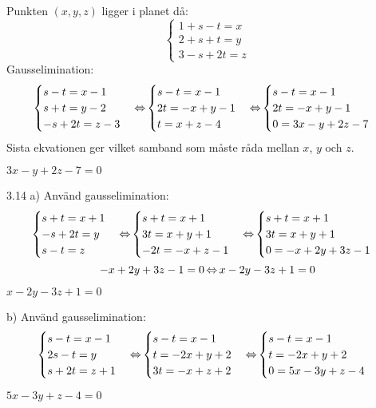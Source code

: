 \pagebreak
\begin{task}{3.13}
	Punkten $(x,y,z)$ ligger i planet då: 
	\[\begin{cases}
		1+s-t=x \\
		2+s+t=y \\
		3-s+2t=z
	\end{cases}\]
	Gausselimination:
	\begin{align*}
		\begin{cases}
			s-t=x-1 \\
			s+t=y-2 \\
			-s+2t=z-3
		\end{cases} \operatorname{\Leftrightarrow}
		\begin{cases}
			s-t=x-1 \\
			2t=-x+y-1 \\
			t=x+z-4
		\end{cases} \operatorname{\Leftrightarrow}
		\begin{cases}
			s-t=x-1 \\
			2t=-x+y-1 \\
			0=3x-y+2z-7
		\end{cases}
	\end{align*}
	Sista ekvationen ger vilket samband som måste råda mellan $x$, $y$ och $z$.

	\ans $3x-y+2z-7=0$
\end{task}

\begin{task}{3.14 a)}
	Använd gausselimination:
	\[\begin{cases}
		s+t=x+1 \\
		-s+2t=y \\
		s-t=z
	\end{cases} \operatorname{\Leftrightarrow}
	\begin{cases}
		s+t=x+1 \\
		3t=x+y+1 \\
		-2t=-x+z-1
	\end{cases} \operatorname{\Leftrightarrow}
	\begin{cases}
		s+t=x+1 \\
		3t=x+y+1 \\
		0=-x+2y+3z-1
	\end{cases}\]
	\[-x+2y+3z-1=0 \operatorname{\Leftrightarrow}
	x-2y-3z+1=0\]

	\ans $x-2y-3z+1=0$
\end{task}

\begin{task}{b)}
	Använd gausselimination:
	\[\begin{cases}
		s-t=x-1 \\
		2s-t=y \\
		s+2t=z+1
	\end{cases} \operatorname{\Leftrightarrow}
	\begin{cases}
		s-t=x-1 \\
		t=-2x+y+2 \\
		3t=-x+z+2
	\end{cases} \operatorname{\Leftrightarrow}
	\begin{cases}
		s-t=x-1 \\
		t=-2x+y+2 \\
		0=5x-3y+z-4
	\end{cases}\]

	\ans $5x-3y+z-4=0$
\end{task}

